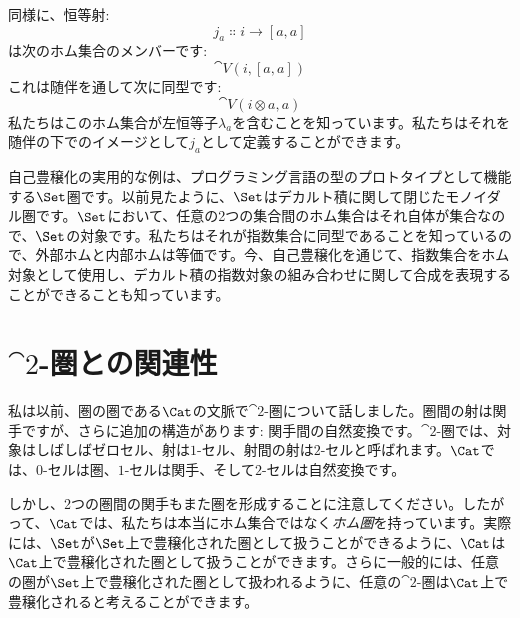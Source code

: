 同様に、恒等射: 
\[j_a \Colon i \to [a, a]\]
は次のホム集合のメンバーです: 
\[\cat{V}(i, [a, a])\]
これは随伴を通して次に同型です: 
\[\cat{V}(i \otimes a, a)\]
私たちはこのホム集合が左恒等子$\lambda_a$を含むことを知っています。私たちはそれを随伴の下でのイメージとして$j_a$として定義することができます。

自己豊穣化の実用的な例は、プログラミング言語の型のプロトタイプとして機能する$\Set$圏です。以前見たように、$\Set$はデカルト積に関して閉じたモノイダル圏です。$\Set$において、任意の2つの集合間のホム集合はそれ自体が集合なので、$\Set$の対象です。私たちはそれが指数集合に同型であることを知っているので、外部ホムと内部ホムは等価です。今、自己豊穣化を通じて、指数集合をホム対象として使用し、デカルト積の指数対象の組み合わせに関して合成を表現することができることも知っています。

\section{$\cat{2}$-圏との関連性}

私は以前、圏の圏である$\Cat$の文脈で$\cat{2}$-圏について話しました。圏間の射は関手ですが、さらに追加の構造があります: 関手間の自然変換です。$\cat{2}$-圏では、対象はしばしばゼロセル、射は$1$-セル、射間の射は$2$-セルと呼ばれます。$\Cat$では、$0$-セルは圏、$1$-セルは関手、そして$2$-セルは自然変換です。

しかし、2つの圏間の関手もまた圏を形成することに注意してください。したがって、$\Cat$では、私たちは本当にホム集合ではなく\emph{ホム圏}を持っています。実際には、$\Set$が$\Set$上で豊穣化された圏として扱うことができるように、$\Cat$は$\Cat$上で豊穣化された圏として扱うことができます。さらに一般的には、任意の圏が$\Set$上で豊穣化された圏として扱われるように、任意の$\cat{2}$-圏は$\Cat$上で豊穣化されると考えることができます。
